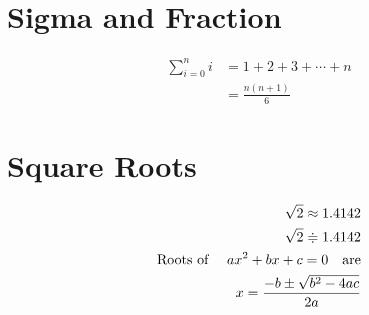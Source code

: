 \documentclass[17pt]{extarticle}
\begin{document}
\section{Sigma and Fraction}

\begin{align}
\sum_{i=0}^n i &= 1+2+3+ \cdots +n \\
			   &=\frac{n(n+1)}{6}
\end{align}
\section{Square Roots}

\begin{align}
\sqrt{2} \approx 1.4142\\
\sqrt{2} \Doteq 1.4142\\
\text{Roots of \quad} ax^2 + bx + c = 0 \text{\quad are}\\
x=\frac{-b \pm \sqrt{b^2 -4ac}}{2a}
\end{align}
\end{document}
